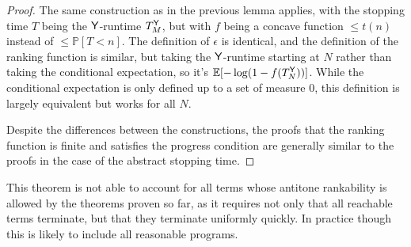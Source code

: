 \begin{proof}
The same construction as in the previous lemma applies, with the stopping time $T$ being the $\mathsf{Y}$-runtime $T_M^{\mathsf{Y}}$, but with $f$ being a concave function $\leq t(n)$ instead of $\leq \mathbb P[T < n]$. The definition of $\epsilon$ is identical, and the definition of the ranking function is similar, but taking the $\mathsf{Y}$-runtime starting at $N$ rather than taking the conditional expectation, so it's $\mathbb E[-\log(1-f(T_N^{\mathsf{Y}}))]$. While the conditional expectation is only defined up to a set of measure 0, this definition is largely equivalent but works for all $N$. 

Despite the differences between the constructions, the proofs that the ranking function is finite and satisfies the progress condition are generally similar to the proofs in the case of the abstract stopping time.
\end{proof}

This theorem is not able to account for all terms whose antitone rankability is allowed by the theorems proven so far, as it requires not only that all reachable terms terminate, but that they terminate uniformly quickly. In practice though this is likely to include all reasonable programs.

